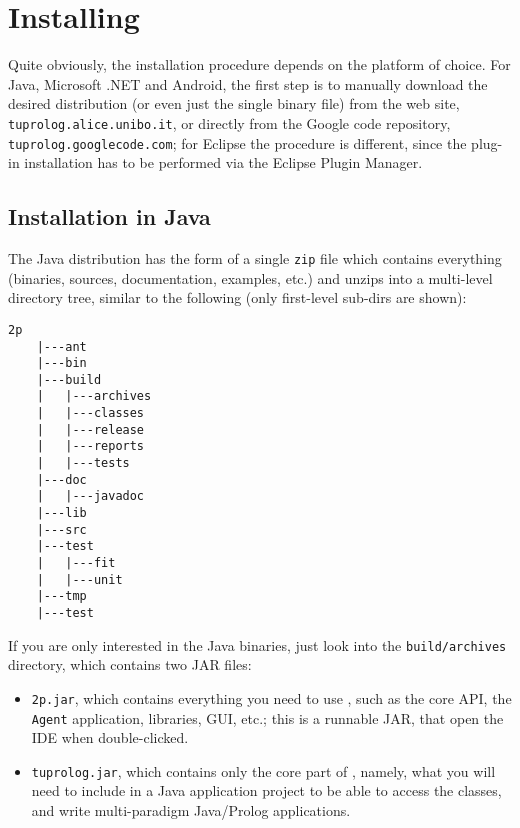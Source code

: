 \chapter{Installing \tuprolog{}}
\label{installation}

Quite obviously, the installation procedure depends on the platform of choice. 
For Java, Microsoft .NET and Android, the first step is to manually download the desired distribution (or even just the single binary file) from the \tuprolog{} web site, \texttt{tuprolog.alice.unibo.it}, or directly from the Google code repository, \texttt{tuprolog.googlecode.com}; for Eclipse the procedure is different, since the plug-in installation has to be performed via the Eclipse Plugin Manager.

\section{Installation in Java}

The Java distribution has the form of a single \texttt{zip} file which contains everything (binaries, sources, documentation, examples, etc.) and unzips into a multi-level directory tree, similar to the following (only first-level sub-dirs are shown):

\begin{Verbatim}[frame=single, framerule=0.5mm, samepage=true, boxwidth=5cm]
    2p
    |---ant
    |---bin
    |---build
    |   |---archives
    |   |---classes
    |   |---release
    |   |---reports
    |   |---tests
    |---doc
    |   |---javadoc
    |---lib
    |---src
    |---test
    |   |---fit
    |   |---unit
    |---tmp
    |---test
\end{Verbatim}

%
If you are only interested in the Java binaries, just look into the \texttt{build/archives} directory, which contains two JAR files:
%
\begin{itemize}
%
\item \texttt{2p.jar}, which contains everything you need to use \tuprolog{},
  such as the core API, the \texttt{Agent} application, libraries, GUI,
  etc.; this is a runnable JAR, that open the \tuprolog{} IDE when double-clicked.
%
\item \texttt{tuprolog.jar}, which contains only the core part of \tuprolog{},
  namely, what you will need to include in a Java application project to be able to access the \tuprolog{} classes, and write multi-paradigm Java/Prolog applications.
\end{itemize}


